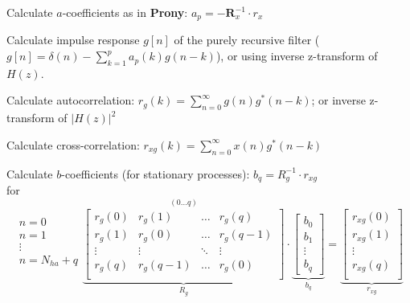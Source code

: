 \begin{aufzaehlung}
  		\item Calculate $a$-coefficients as in \textbf{Prony}: $a_p = - \bm R_x^{-1} \cdot r_x$   
  		\item Calculate impulse response $g[n]$ of the purely recursive filter ($g[n] = \delta(n)- \sum\limits_{k=1}^p a_p(k)g(n-k)$), 
  		or using inverse z-transform of $H(z)$.
  		\item Calculate autocorrelation:  $r_g(k)=\sum\limits_{n=0}^\infty g(n)g^*(n-k)$; or inverse z-transform of $|H(z)|^2$
  		\item Calculate cross-correlation: $r_{xg}(k)=\sum\limits_{n=0}^\infty x(n)g^*(n-k)$
  		\item Calculate $b$-coefficients (for stationary processes): $b_q = R_g^{-1} \cdot r_{xg}$ \\
  		for\\

		 $$\begin{matrix}n=0\\ n=1\\ \vdots\\ n=N_{ha}+q\\ \end{matrix}
		\overset{(0 \hdots q)}{\underbrace{\begin{bmatrix}
    		r_g(0) & r_g(1) & \hdots & r_g(q) \\                                            
    		r_g(1) & r_g(0) & \hdots & r_g(q-1) \\         
    		\vdots & \vdots & \ddots & \vdots \\                                      
    		r_g(q) &r_g(q-1) & \hdots & r_g(0) \\    
		\end{bmatrix}  }_{R_g}} \cdot \underbrace{\begin{bmatrix}
    		b_0 \\
    		b_1 \\
    		\vdots \\
    		b_q
		\end{bmatrix}  }_{b_q}= \underbrace{\begin{bmatrix}
    		r_{xg}(0) \\
    		r_{xg}(1) \\
    		\vdots \\
    		r_{xg}(q) \\
		\end{bmatrix}  }_{r_{xg}} $$
\end{aufzaehlung}

